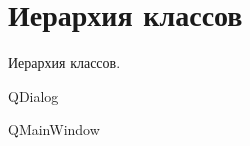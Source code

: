 \section{Иерархия классов}
Иерархия классов.\begin{DoxyCompactList}
\item Q\+Dialog\begin{DoxyCompactList}
\item {}
\end{DoxyCompactList}
\item Q\+Main\+Window\begin{DoxyCompactList}
\item {}
\end{DoxyCompactList}
\end{DoxyCompactList}
